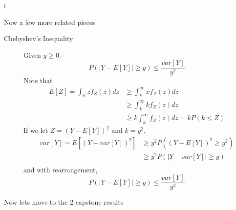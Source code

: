 i\documentclass[10pt]{article}
\begin{document}
Now a few more related pieces

\begin{description}
    \item[Chebyshev's Inequality] Given $y \geq 0$. 
        \[ P(|Y - E[Y]| \geq y) \leq \frac{var[Y]}{y^2} \]
        Note that
        \begin{align*}
            E[Z] = \int_{\mathbb{R}}zf_Z(z)dz &\geq \int_k^{\infty} xf_Z(z)dz \\
                                              &\geq \int_k^{\infty} kf_Z(z)dz  \\
                                              &\geq k\int_k^{\infty} f_Z(z)dz = kP(k \leq Z)
        \end{align*}
        If we let $Z = (Y - E[Y])^2$ and $k = y^2$,
        \begin{align*}
            var[Y] = E[(Y - var[Y])^2] &\geq y^2 P((Y - E[Y])^2 \geq y^2) \\
                                         &\geq y^2 P(|Y-var[Y]| \geq y) \\
        \end{align*}
        and with rearrangement,
        \[P(|Y-E[Y]| \geq y) \leq \frac{var[Y]}{y^2} \]
\end{description}
Now lets move to the 2 capstone results 
\end{document}
